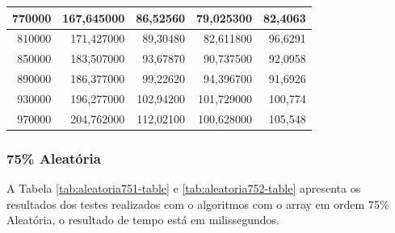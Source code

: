 \documentclass[a4paper, 12pt]{article}
\begin{document}
\begin{longtable}[c]{@{}rrrrr@{}}
	\multicolumn{1}{|r|}{770000}                  & \multicolumn{1}{r|}{167,645000}    & \multicolumn{1}{r|}{86,52560}      & \multicolumn{1}{r|}{79,025300}     & \multicolumn{1}{r|}{82,4063}       \\* \midrule
	\multicolumn{1}{|r|}{810000}                  & \multicolumn{1}{r|}{171,427000}    & \multicolumn{1}{r|}{89,30480}      & \multicolumn{1}{r|}{82,611800}     & \multicolumn{1}{r|}{96,6291}       \\* \midrule
	\multicolumn{1}{|r|}{850000}                  & \multicolumn{1}{r|}{183,507000}    & \multicolumn{1}{r|}{93,67870}      & \multicolumn{1}{r|}{90,737500}     & \multicolumn{1}{r|}{92,0958}       \\* \midrule
	\multicolumn{1}{|r|}{890000}                  & \multicolumn{1}{r|}{186,377000}    & \multicolumn{1}{r|}{99,22620}      & \multicolumn{1}{r|}{94,396700}     & \multicolumn{1}{r|}{91,6926}       \\* \midrule
	\multicolumn{1}{|r|}{930000}                  & \multicolumn{1}{r|}{196,277000}    & \multicolumn{1}{r|}{102,94200}     & \multicolumn{1}{r|}{101,729000}    & \multicolumn{1}{r|}{100,774}       \\* \midrule
	\multicolumn{1}{|r|}{970000}                  & \multicolumn{1}{r|}{204,762000}    & \multicolumn{1}{r|}{112,02100}     & \multicolumn{1}{r|}{100,628000}    & \multicolumn{1}{r|}{105,548}       \\* \bottomrule
\end{longtable}
\subsubsection{75\% Aleatória}
A Tabela \ref{tab:aleatoria751-table} e \ref{tab:aleatoria752-table}  apresenta os resultados dos testes realizados com o algoritmos com o array em ordem 75\% Aleatória, o resultado de tempo está em milissegundos.
\end{document}
